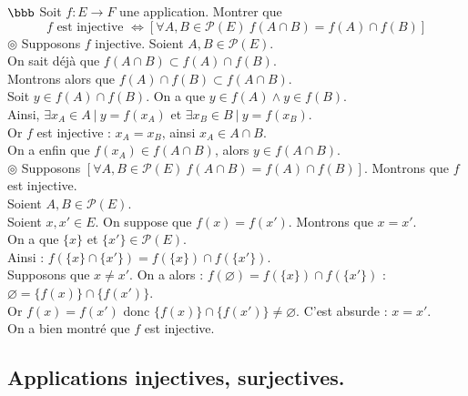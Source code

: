 \documentclass[11pt]{article}
\begin{document}
\begin{exercice}{$\bbb$}{}
    Soit $f:E\to F$ une application. Montrer que
    \begin{equation*}
        f \text{ est injective } \iff [\forall A,B \in \mathcal{P}(E) ~ f(A \cap B) = f(A) \cap f(B)]
    \end{equation*}
    \tcblower
    $\circledcirc$ Supposons $f$ injective. Soient $A,B \in \mathcal{P}(E)$.\\
    On sait déjà que $f(A \cap B) \subset f(A) \cap f(B)$.\\
    Montrons alors que $f(A) \cap f(B) \subset f(A \cap B)$.\\
    Soit $y \in f(A) \cap f(B)$. On a que $y \in f(A) \wedge y \in f(B)$.\\
    Ainsi, $\exists x_A \in A ~ | ~ y = f(x_A)$ et $\exists x_B \in B ~ | ~ y = f(x_B)$.\\
    Or $f$ est injective : $x_A = x_B$, ainsi $x_A \in A \cap B$.\\
    On a enfin que $f(x_A) \in f(A \cap B)$, alors $y \in f(A \cap B)$.\\[0.2cm]
    $\circledcirc$ Supposons $[\forall A,B \in \mathcal{P}(E) ~ f(A \cap B) = f(A) \cap f(B)]$. Montrons que $f$ est injective.\\
    Soient $A,B \in \mathcal{P}(E)$.\\
    Soient $x,x' \in E$. On suppose que $f(x) = f(x')$. Montrons que $x = x'$.\\
    On a que $\{x\}$ et $\{x'\} \in \mathcal{P}(E)$.\\
    Ainsi : $f(\{x\} \cap \{x'\}) = f(\{x\}) \cap f(\{x'\})$.\\
    Supposons que $x \neq x'$. On a alors : $f(\varnothing) = f(\{x\}) \cap f(\{x'\})$ : $\varnothing = \{f(x)\} \cap \{f(x')\}$.\\
    Or $f(x) = f(x')$ donc $\{f(x)\} \cap \{f(x')\} \neq \varnothing$. C'est absurde : $x = x'$.\\
    On a bien montré que $f$ est injective.
\end{exercice}

\subsection*{Applications injectives, surjectives.}
\end{document}
